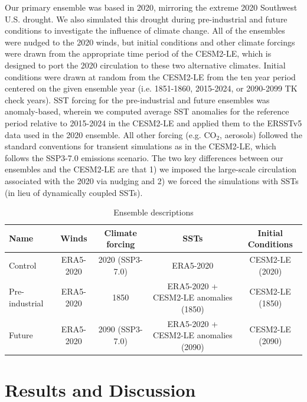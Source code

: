 \documentclass[draft]{agujournal2019}
\begin{document}
Our primary ensemble was based in 2020, mirroring the extreme 2020 Southwest U.S. drought. We also simulated this drought during pre-industrial and future conditions to investigate the influence of climate change. All of the ensembles were nudged to the 2020 winds, but initial conditions and other climate forcings were drawn from the appropriate time period of the CESM2-LE, which is designed to port the 2020 circulation to these two alternative climates. Initial conditions were drawn at random from the CESM2-LE from the ten year period centered on the given ensemble year (i.e. 1851-1860, 2015-2024, or 2090-2099 TK check years). SST forcing for the pre-industrial and future ensembles was anomaly-based, wherein we computed average SST anomalies for the reference period relative to 2015-2024 in the CESM2-LE and applied them to the ERSSTv5 data used in the 2020 ensemble. All other forcing (e.g. CO$_2$, aerosols) followed the standard conventions for transient simulations as in the CESM2-LE, which follows the SSP3-7.0 emissions scenario. The two key differences between our ensembles and the CESM2-LE are that 1) we imposed the large-scale circulation associated with the 2020 via nudging and 2) we forced the simulations with SSTs (in lieu of dynamically coupled SSTs). 

 \begin{table}[h]
 \caption{Ensemble descriptions}
 \centering
 \begin{tabular}{l c c c c}
 \hline
  Name  & Winds & Climate forcing & SSTs & Initial Conditions \\
 \hline
   Control  & ERA5-2020& 2020 (SSP3-7.0) & ERA5-2020 & CESM2-LE (2020)\\
   Pre-industrial  & ERA5-2020 & 1850 & ERA5-2020 + CESM2-LE anomalies (1850) & CESM2-LE (1850) \\
   Future        & ERA5-2020 & 2090 (SSP3-7.0) & ERA5-2020 + CESM2-LE anomalies (2090) & CESM2-LE (2090) \\
 \hline
 \end{tabular}
 \label{tab:exps}
 \end{table}


%
%
\clearpage
\section{Results and Discussion}
\end{document}

